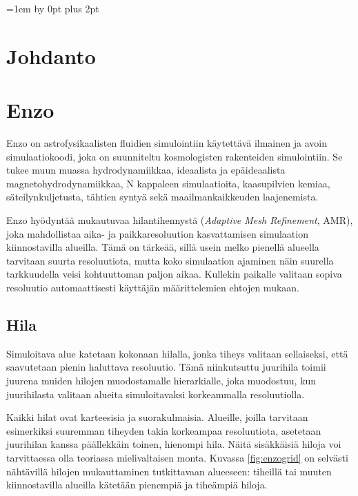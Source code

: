 \documentclass[12pt,a4paper]{article}
\begin{document}
\newpage
\tableofcontents
\thispagestyle{empty}
\newpage
\setcounter{page}{1}
\parskip=1em \advance\parskip by 0pt plus 2pt
\pagestyle{fancy}
\cfoot{\thepage}

\section{Johdanto}

\section{Enzo}
Enzo on astrofysikaalisten fluidien simulointiin käytettävä ilmainen ja avoin simulaatiokoodi, joka on suunniteltu kosmologisten rakenteiden simulointiin. Se tukee muun muassa hydrodynamiikkaa, ideaalista ja epäideaalista magnetohydrodynamiikkaa, N kappaleen simulaatioita, kaasupilvien kemiaa, säteilynkuljetusta, tähtien syntyä sekä maailmankaikkeuden laajenemista. \cite{enzo} %

Enzo hyödyntää mukautuvaa hilantihennystä (\textit{Adaptive Mesh Refinement}, AMR), joka mahdollistaa aika- ja paikkaresoluution kasvattamisen simulaation kiinnostavilla alueilla. Tämä on tärkeää, sillä usein melko pienellä alueella tarvitaan suurta resoluutiota, mutta koko simulaation ajaminen näin suurella tarkkuudella veisi kohtuuttoman paljon aikaa. Kullekin paikalle valitaan sopiva resoluutio automaattisesti käyttäjän määrittelemien ehtojen mukaan. \cite{enzo}

\subsection{Hila}
Simuloitava alue katetaan kokonaan hilalla, jonka tiheys valitaan sellaiseksi, että saavutetaan pienin haluttava resoluutio. Tämä niinkutsuttu juurihila toimii juurena muiden hilojen muodostamalle hierarkialle, joka muodostuu, kun juurihilasta valitaan alueita simuloitavaksi korkeammalla resoluutiolla.\cite{enzo}
	
Kaikki hilat ovat karteesisia ja suorakulmaisia. Alueille, joilla tarvitaan esimerkiksi suuremman tiheyden takia korkeampaa resoluutiota, asetetaan juurihilan kanssa päällekkäin toinen, hienompi hila. Näitä sisäkkäisiä hiloja voi tarvittaessa olla teoriassa mielivaltaisen monta. Kuvassa \ref{fig:enzogrid} on selvästi nähtävillä hilojen mukauttaminen tutkittavaan alueeseen: tiheillä tai muuten kiinnostavilla alueilla kätetään pienempiä ja tiheämpiä hiloja. \cite{enzo} %
\end{document}
